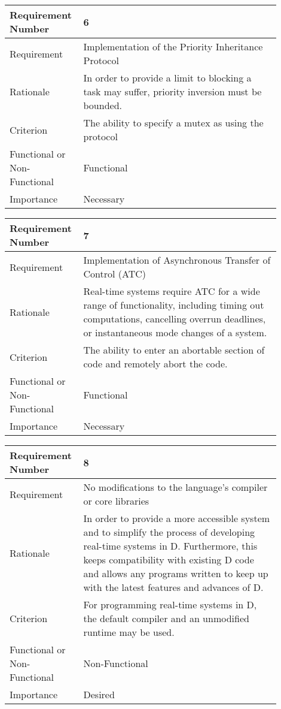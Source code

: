 \begin{table}[!htbp]
\centering
\begin{tabular}{|L{0.2\linewidth}|L{0.7\linewidth}|}
\hline
Requirement Number & 6 \\ \hline
Requirement & Implementation of the Priority Inheritance Protocol \\ \hline
Rationale      & In order to provide a limit to blocking a task may suffer, priority 
                inversion must be bounded. \\ \hline
Criterion      & The ability to specify a mutex as using the protocol\\ \hline
Functional or Non-Functional & Functional \\ \hline
Importance     & Necessary \\ \hline
\end{tabular}
\end{table}
\begin{table}[!htbp]
\centering
\begin{tabular}{|L{0.2\linewidth}|L{0.7\linewidth}|}
\hline
Requirement Number & 7 \\ \hline
Requirement & Implementation of Asynchronous Transfer of Control (ATC) \\ \hline
Rationale      & Real-time systems require ATC for a wide range of functionality, 
                including timing out computations, cancelling overrun deadlines,  
                or instantaneous mode changes of a system. \\ \hline
Criterion      & The ability to enter an abortable section of code and remotely  
                abort the code. \\ \hline
Functional or Non-Functional & Functional \\ \hline
Importance     & Necessary \\ \hline
\end{tabular}
\end{table}
\begin{table}[!htbp]
\centering
\begin{tabular}{|L{0.2\linewidth}|L{0.7\linewidth}|}
\hline
Requirement Number & 8 \\ \hline
Requirement & No modifications to the language's compiler or core libraries \\ \hline
Rationale      & In order to provide a more accessible system and to simplify the 
                process of developing real-time systems in D. Furthermore, this 
                keeps compatibility with existing D code and allows any programs  
                written to keep up with the latest features and advances of D. \\ \hline
Criterion      & For programming real-time systems in D, the default compiler and  
                an unmodified runtime may be used. \\ \hline
Functional or Non-Functional & Non-Functional \\ \hline
Importance     & Desired \\ \hline
\end{tabular}
\end{table}
